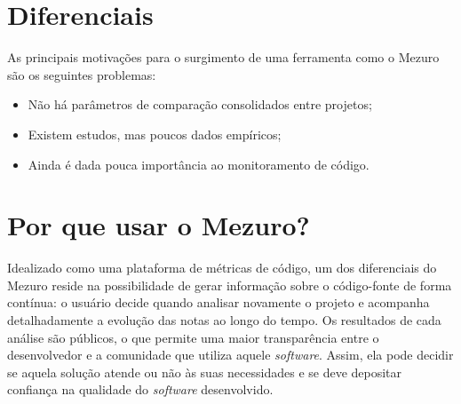 \documentclass{llncs}
\begin{document}
\section{Diferenciais} \label{subsec:motivacao}
As principais motivações para o surgimento de uma ferramenta como o Mezuro são os seguintes problemas:
\begin{itemize}
    \item Não há parâmetros de comparação consolidados entre projetos;
    \item Existem estudos, mas poucos dados empíricos;
    \item Ainda é dada pouca importância ao monitoramento de código.
\end{itemize}

\section{Por que usar o Mezuro?} \label{sec:projeto-mezuro}
Idealizado como uma plataforma de métricas de código, um dos diferenciais do Mezuro reside na possibilidade de gerar informação sobre o código-fonte de forma contínua: o usuário decide quando analisar novamente o projeto e acompanha detalhadamente a evolução das notas ao longo do tempo. Os resultados de cada análise são públicos, o que permite uma maior transparência entre o desenvolvedor e a comunidade que utiliza aquele \textit{software}. Assim, ela pode decidir se aquela solução atende ou não às suas necessidades e se deve depositar confiança na qualidade do \textit{software} desenvolvido.
\end{document}
